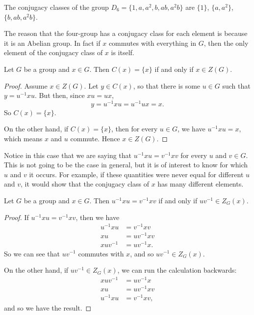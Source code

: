 \begin{example}
  The conjugacy classes of the group $D_{6} = \{1, a, a^{2}, b, ab, a^{2}b\}$
  are $\{1\}$, $\{a, a^{2}\}$, $\{b, ab, a^{2}b\}$.
\end{example}

The reason that the four-group has a conjugacy class for each element is
because it is an Abelian group.  In fact if $x$ commutes with everything in
$G$, then the only element of the conjugacy class of $x$ is itself.

\begin{proposition}\label{prop:centreconjugates}
  Let $G$ be a group and $x \in G$.  Then $C(x) = \{x\}$ if and only 
  if $x \in Z(G)$.
\end{proposition}
\begin{proof}
  Assume $x \in Z(G)$.  Let $y \in C(x)$, so that there is some $u \in
  G$ such that $y = u^{-1}xu$.  But then, since $xu = ux$,
  \[
    y = u^{-1}xu = u^{-1}ux = x.
  \]
  So $C(x) = \{x\}$.
  
  On the other hand, if $C(x) = \{x\}$, then for every $u \in G$, we 
  have $u^{-1}xu = x$, which means $x$ and $u$ commute.  Hence $x \in 
  Z(G)$.
\end{proof}

Notice in this case that we are saying that $u^{-1}xu = v^{-1}xv$ for
every $u$ and $v \in G$.  This is not going to be the case in general,
but it is of interest to know for which $u$ and $v$ it occurs.  For
example, if these quantities were never equal for different $u$ and
$v$, it would show that the conjugacy class of $x$ has many different 
elements.

\begin{proposition}
  Let $G$ be a group and $x \in G$.  Then $u^{-1}xu = v^{-1}xv$ if 
  and only if $uv^{-1} \in Z_{G}(x)$.
\end{proposition}
\begin{proof}
  If $u^{-1}xu = v^{-1}xv$, then we have
  \begin{align*}
    u^{-1}xu &= v^{-1}xv \\
    xu &= uv^{-1}xv \\
    xuv^{-1} &= uv^{-1}x.
  \end{align*}
  So we can see that $uv^{-1}$ commutes with $x$, and so $uv^{-1} \in 
  Z_{G}(x)$.
  
  On the other hand, if $uv^{-1} \in Z_{G}(x)$, we can run the 
  calculation backwards:
  \begin{align*}
    xuv^{-1} &= uv^{-1}x \\
    xu &= uv^{-1}xv \\
    u^{-1}xu &= v^{-1}xv,
  \end{align*}
  and so we have the result.
\end{proof}

